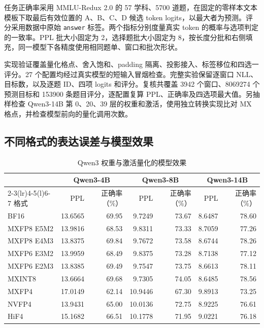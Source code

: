 \documentclass[10.5pt,compsoc,UTF8]{CjC}
\begin{document}
任务正确率采用 MMLU-Redux 2.0 的 57 学科、5700 道题\cite{mmluredux}，在固定的零样本文本模板下取最后有效位置的 A、B、C、D 候选 token logits，以最大者为预测。评分采用数据中原始 \texttt{answer} 标签。两个指标分别度量真实 token 的概率与选项判定的一致率。PPL 批大小固定为 2，选择题批大小固定为 8，按长度分批和右侧填充，同一模型下各精度使用相同题单、窗口和批次形状。

实现验证覆盖量化格点、舍入饱和、padding 隔离、投影接入、标签移位和四选一评分。27 个配置均经过真实模型的短输入冒烟检查。完整实验保留逐窗口 NLL、目标数，以及逐题 ID、四项 logits 和评分。复核共覆盖 3942 个窗口、8069274 个预测目标和 153900 条题目评分，逐配置复算 PPL、正确率及四选项最大值。另抽样检查 Qwen3-14B 第 0、20、39 层的权重和激活，使用独立转换实现比对 MX 格点，并检查模型前向的量化调用次数。

\subsection{不同格式的表达误差与模型效果}

\begin{table}[htbp]
\centering
\caption{Qwen3 权重与激活量化的模型效果}
\label{tab:qwen}
\begin{tabular}{@{}lrrrrrr@{}}
\toprule
& \multicolumn{2}{c}{Qwen3-4B} & \multicolumn{2}{c}{Qwen3-8B} & \multicolumn{2}{c}{Qwen3-14B} \\
\cmidrule(lr){2-3}\cmidrule(lr){4-5}\cmidrule(l){6-7}
格式 & PPL & 正确率（\%） & PPL & 正确率（\%） & PPL & 正确率（\%） \\
\midrule
BF16 & 13.6565 & 69.95 & 9.7249 & 73.67 & 8.6487 & 78.60 \\
MXFP8 E5M2 & 13.9816 & 68.53 & 9.8311 & 73.33 & 8.7059 & 77.26 \\
MXFP8 E4M3 & 13.8375 & 69.84 & 9.7672 & 73.58 & 8.6744 & 78.26 \\
MXFP6 E3M2 & 13.9959 & 68.49 & 9.8375 & 73.28 & 8.7138 & 77.12 \\
MXFP6 E2M3 & 13.8385 & 69.49 & 9.7547 & 73.75 & 8.6613 & 78.11 \\
MXINT8 & 13.6664 & 69.68 & 9.7305 & 74.05 & 8.6485 & 78.56 \\
MXFP4 & 17.0149 & 62.14 & 10.9446 & 67.30 & 9.8913 & 73.25 \\
NVFP4 & 13.9431 & 65.00 & 10.0136 & 72.75 & 8.9225 & 76.61 \\
HiF4 & 15.1682 & 66.51 & 10.1778 & 71.95 & 9.0221 & 76.18 \\
\bottomrule
\end{tabular}
\end{table}
\end{document}
